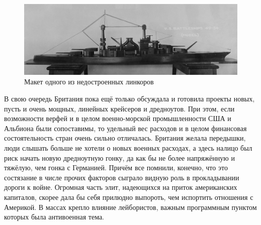 \begin{figure}[h!tb] 
	\centering\includegraphics[scale=0.2]{Glava6/tdsTMXV67x0.jpg}
	\caption{Макет одного из недостроенных линкоров}%
\end{figure}

В свою очередь Британия пока ещё только обсуждала и готовила проекты новых, пусть и очень мощных, линейных крейсеров и дредноутов. При этом, если возможности верфей и в целом военно-морской промышленности США и Альбиона были сопоставимы, то удельный вес расходов и в целом финансовая состоятельность стран очень сильно отличалась. Британия желала передышки, люди слышать больше не хотели о новых военных расходах, а здесь налицо был риск начать новую дредноутную гонку, да как бы не более напряжённую и тяжёлую, чем гонка с Германией. Причём все помнили, конечно, что это состязание в числе прочих факторов сыграло видную роль в прокладывании дороги к войне. Огромная часть элит, надеющихся на приток американских капиталов, скорее дала бы себя прилюдно выпороть, чем испортить отношения с Америкой. В массах крепло влияние лейбористов, важным программным пунктом которых была антивоенная тема.

